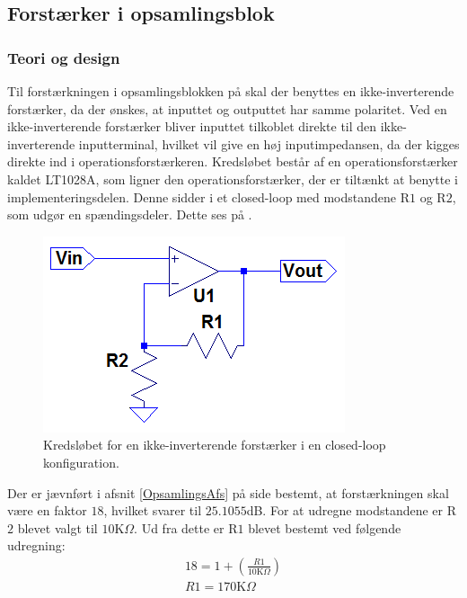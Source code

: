 \subsection{Forstærker i opsamlingsblok}
\subsubsection{Teori og design}
Til forstærkningen i opsamlingsblokken på  skal der benyttes en ikke-inverterende forstærker, da der ønskes, at inputtet og outputtet har samme polaritet. Ved en ikke-inverterende forstærker bliver inputtet tilkoblet direkte til den ikke-inverterende inputterminal, hvilket vil give en høj inputimpedansen, da der kigges direkte ind i operationsforstærkeren. Kredsløbet består af en operationsforstærker kaldet LT1028A, som ligner den operationsforstærker, der er tiltænkt at benytte i implementeringsdelen. Denne sidder i et closed-loop med modstandene R$1$ og R$2$, som udgør en spændingsdeler. Dette ses på .
\begin{figure}[H]
\centering
\includegraphics[scale=0.85]{figures/cProblemloesning/Forstaerker.PNG}
\caption{Kredsløbet for en ikke-inverterende forstærker i en closed-loop konfiguration.}
\label{fig:Forstaerker}
\end{figure} 

Der er jævnført i afsnit \ref{OpsamlingsAfs} på side \pageref{OpsamlingsAfs} bestemt, at forstærkningen skal være en faktor $18$, hvilket svarer til $25.1055$dB. For at udregne modstandene er R$2$ blevet valgt til $10$K$\Omega$. Ud fra dette er R$1$ blevet bestemt ved følgende udregning:
\begin{align}
18 = 1 + (\frac{R1}{10\text{K}\Omega})\\
R1 = 170\text{K}\Omega
\end{align}

